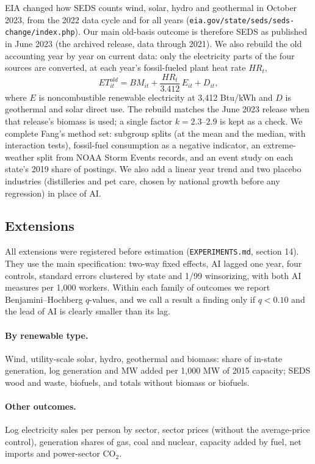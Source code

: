 EIA changed how SEDS counts wind, solar, hydro and geothermal in October 2023, from the 2022 data cycle and for all years (\texttt{eia.gov/state/seds/seds-change/index.php}). Our main old-basis outcome is therefore SEDS as published in June 2023 (the archived release, data through 2021). We also rebuild the old accounting year by year on current data: only the electricity parts of the four sources are converted, at each year's fossil-fueled plant heat rate $HR_t$,
\begin{equation}
ET^{old}_{it} = BM_{it} + \frac{HR_t}{3.412}\,E_{it} + D_{it},
\end{equation}
where $E$ is noncombustible renewable electricity at 3,412 Btu/kWh and $D$ is geothermal and solar direct use. The rebuild matches the June 2023 release when that release's biomass is used; a single factor $k = 2.3$--$2.9$ is kept as a check. We complete Fang's method set: subgroup splits (at the mean and the median, with interaction tests), fossil-fuel consumption as a negative indicator, an extreme-weather split from NOAA Storm Events records, and an event study on each state's 2019 share of postings. We also add a linear year trend and two placebo industries (distilleries and pet care, chosen by national growth before any regression) in place of AI.

\subsection{Extensions}
All extensions were registered before estimation (\texttt{EXPERIMENTS.md}, section 14). They use the main specification: two-way fixed effects, AI lagged one year, four controls, standard errors clustered by state and 1/99 winsorizing, with both AI measures per 1,000 workers. Within each family of outcomes we report Benjamini--Hochberg $q$-values, and we call a result a finding only if $q<0.10$ and the lead of AI is clearly smaller than its lag.

\paragraph{By renewable type.} Wind, utility-scale solar, hydro, geothermal and biomass: share of in-state generation, log generation and MW added per 1,000 MW of 2015 capacity; SEDS wood and waste, biofuels, and totals without biomass or biofuels.

\paragraph{Other outcomes.} Log electricity sales per person by sector, sector prices (without the average-price control), generation shares of gas, coal and nuclear, capacity added by fuel, net imports and power-sector CO$_2$.

